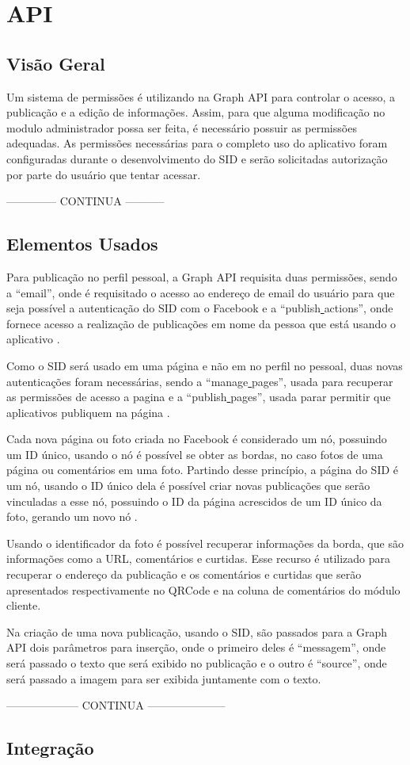 \chapter[API]{API}
\section{Visão Geral}
Um sistema de permissões é utilizando na Graph API para controlar o acesso, a publicação e a edição de informações. Assim, para que alguma modificação no modulo administrador possa ser feita, é necessário possuir as permissões adequadas. As permissões necessárias para o completo uso do aplicativo foram configuradas durante o desenvolvimento do SID e serão solicitadas autorização por parte do usuário que tentar acessar.

-------------- CONTINUA -----------

\section{Elementos Usados}
Para publicação no perfil pessoal, a Graph API requisita duas permissões, sendo a “email”, onde é requisitado o acesso ao endereço de email do usuário para que seja possível a autenticação do SID com o Facebook e a “publish\underline{{ }}actions”, onde fornece acesso a realização de publicações em nome da pessoa que está usando o aplicativo \cite{facebook2018a}.

Como o SID será usado em uma página e não em no perfil no pessoal, duas novas autenticações foram necessárias, sendo a “manage\underline{{ }}pages”, usada para recuperar as permissões de acesso a pagina e a “publish\underline{{ }}pages”, usada parar permitir que aplicativos publiquem na página \cite{facebook2018a}.

Cada nova página ou foto criada no Facebook é considerado um nó, possuindo um ID único, usando o nó é possível se obter as bordas, no caso fotos de uma página ou comentários em uma foto. Partindo desse princípio, a página do SID é um nó, usando o ID único dela é possível criar novas publicações que serão vinculadas a esse nó, possuindo o ID da página acrescidos de um ID único da foto, gerando um novo nó \cite{facebook2018b}.

Usando o identificador da foto é possível recuperar informações da borda, que são informações como a URL, comentários e curtidas. Esse recurso é utilizado para recuperar o endereço da publicação e os comentários e curtidas que serão apresentados respectivamente no QRCode e na coluna de comentários do módulo cliente.

Na criação de uma nova publicação, usando o SID, são passados para a Graph API dois parâmetros para inserção, onde o primeiro deles é “messagem”, onde será passado o texto que será exibido no publicação e o outro é “source”, onde será passado a imagem para ser exibida juntamente com o texto.

——————– CONTINUA ———————



\section{Integração}